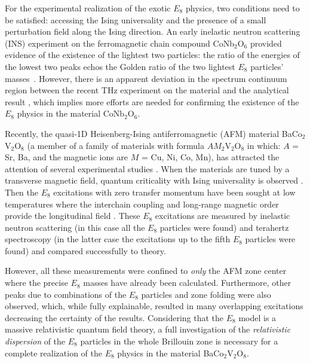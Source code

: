 \documentclass[aps,prl,twocolumn,superscriptaddress,groupedaddress]{revtex4}
\begin{document}
For the experimental realization of the exotic $E_8$ physics,
two conditions need to be satisfied: accessing the Ising universality
and the presence of a small perturbation field along the Ising direction.
An early inelastic neutron scattering (INS) experiment on the ferromagnetic chain compound CoNb$_2$O$_6$ provided evidence of the existence of the lightest two particles:
the ratio of the energies of the lowest two peaks echos the
Golden ratio of the two lightest $E_8$ particles' masses~\cite{Coldea_2010}.
However, there is an apparent deviation in the spectrum continuum region between
the recent THz experiment on the material \cite{PhysRevB.101.220411} and
the analytical result \cite{xiao_2021}, which implies more efforts \cite{Armitage_2021, Fava25219} are needed for confirming the existence of the $E_8$ physics in the material CoNb$_2$O$_6$.

Recently, the quasi-1D Heisenberg-Ising antiferromagnetic (AFM) material BaCo$_2$V$_2$O$_8$ (a member of a family of materials with formula $AM_2$V$_2$O$_8$ in which: $A$ = Sr, Ba, and the magnetic ions are $M$ = Cu, Ni, Co, Mn), has attracted the attention of several experimental studies \cite{Faure:2017iup, PhysRevB.87.224413}.
When the materials are tuned by a transverse magnetic field, quantum criticality
with Ising universality is observed \cite{Zou_2021}.
Then the $E_8$ excitations with zero transfer momentum have been sought at low temperatures where the interchain coupling and long-range magnetic order provide the longitudinal field \cite{Zou_2021, PhysRevB.101.220411}. These $E_8$ excitations are measured by inelastic neutron scattering \cite{Zou_2021} (in this case all the $E_8$ particles were found) and terahertz spectroscopy \cite{PhysRevB.101.220411} (in the latter case the excitations
up to the fifth $E_8$ particles were found) and compared successfully to theory.

However, all these measurements were confined to \textit{only} the AFM zone center where the precise $E_8$ masses have already been calculated.
Furthermore, other peaks due to combinations of the $E_8$ particles and zone folding were also observed, which, while fully explainable, resulted in many overlapping excitations decreasing the certainty of the results. Considering that the $E_8$ model is a massive relativistic quantum field theory, a full investigation of the {\it relativistic dispersion} of the $E_8$ particles in the whole Brillouin zone is necessary for a complete realization of the $E_8$ physics in the material BaCo$_2$V$_2$O$_8$.
\end{document}
